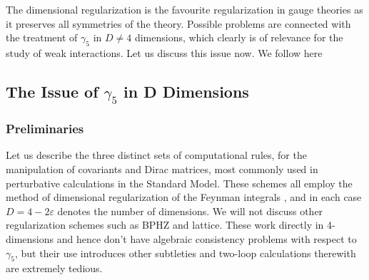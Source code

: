 \documentclass[12pt]{article}
\begin{document}
\begin{itemize}
The dimensional regularization is the favourite regularization in
gauge theories  as it preserves all symmetries of the theory. Possible
problems are connected with the treatment of $\gamma_5$ in $D\not=4$
dimensions, which clearly is of relevance for the study of weak
interactions. Let us discuss this issue now. We follow here
\cite{WEISZ}
\subsection{The Issue of $\gamma_5$ in D Dimensions}
\subsubsection{Preliminaries}
  Let us describe the three distinct sets of computational rules,
 for the manipulation of covariants and Dirac matrices,
 most commonly used in perturbative calculations in the Standard Model.
  These schemes all employ the method
 of dimensional regularization of the Feynman integrals \cite{HV,BM},
 and in each case $D=4-2\varepsilon$ denotes the number of dimensions.
 We will not discuss other regularization schemes such as BPHZ and lattice.
 These work directly in 4-dimensions and hence don't have algebraic
 consistency problems with respect to $\gamma_5$, but their use 
introduces other
 subtleties and two-loop calculations therewith are extremely tedious.
 

\end{itemize}
\end{document}
